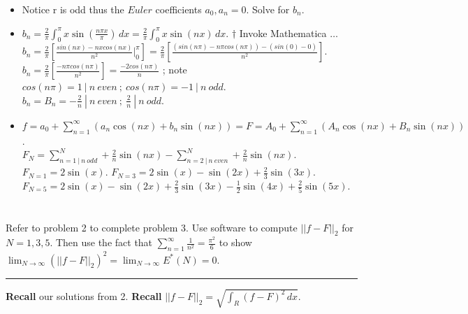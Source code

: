 \documentclass[10pt]{article}
\begin{document}
\begin{itemize}
    \item Notice r is odd thus the $ Euler $ coefficients $ a_0, a_n = 0 $. Solve for $ b_n $. \\
    \item $ \displaystyle b_n = \frac{2}{\pi}  \int_{0}^{\pi}  x \sin(\frac{n\pi x}{\pi}) \,dx = \frac{2}{\pi}  \int_{0}^{\pi} x \sin(nx) \,dx $. $ \dagger $ Invoke Mathematica $ \dots $ \\
    \subitem $ \displaystyle b_n = \frac{2}{\pi} [\frac{sin(nx) - nx cos(nx)}{n^2} \Big|_{0}^{\pi}] = \frac{2}{\pi} [\frac{(sin(n \pi) - n \pi cos(n \pi)) - (sin(0) - 0)}{n^2}] $.
    \subitem $ \displaystyle b_n = \frac{2}{\pi} [\frac{- n \pi cos(n \pi)}{n^2}]  = \frac{- 2 cos(n \pi)}{n} $ ; note $ cos(n\pi) = 1 \ | \ n \ even \ ; \ cos(n\pi) = -1 \ | \ n \ odd $.
    \subitem $ \displaystyle b_n = B_n = -\frac{2}{n} \ | \ n \ even \ ; \ \frac{2}{n} \ | \ n \ odd $.
    \item $ \displaystyle f = a_0 + \sum_{n = 1}^{\infty} (a_n \cos(nx) + b_n \sin (nx)) = F = A_0 + \sum_{n = 1}^{\infty} (A_n\cos(nx) + B_n\sin(nx)) $. \\
    \subitem $ \displaystyle F_N = \sum_{n = 1 \ | \ n \ odd}^N + \frac{2}{n} \sin(nx) - \sum_{n = 2 \ | \ n \ even}^N + \frac{2}{n} \sin(nx) $.
    \subitem $ \displaystyle F_{N = 1} = 2 \sin(x) $.
    \subitem $ \displaystyle F_{N = 3} = 2 \sin(x) - \sin(2x) + \frac{2}{3} \sin(3x) $.
    \subitem $ \displaystyle F_{N = 5} = 2 \sin(x) - \sin(2x) + \frac{2}{3} \sin(3x) - \frac{1}{2} \sin(4x) + \frac{2}{5} \sin(5x) $.
\end{itemize}


\newpage


\section{\underline{}}
\label{sec: Problem 3}
\noindent
Refer to problem 2 to complete problem 3. Use software to compute $ ||f-F||_2 $ for $ N = 1, 3, 5 $. Then use the fact that $ \displaystyle \sum_{n = 1}^\infty \frac{1}{n^2} = \frac{\pi^2}{6} $ to show $ \displaystyle \lim_{N\to\infty}(||f-F||_2)^2 = \lim_{N\to\infty}E^*(N) = 0 $. \\
\vspace{2.5mm}
\hrule

\vspace{7.5mm}

\noindent
\textbf{Recall} our solutions from 2. \textbf{Recall} $ \displaystyle ||f-F||_2 = \sqrt{\int_{R} (f - F)^2 \,dx} $. \\
\end{document}
